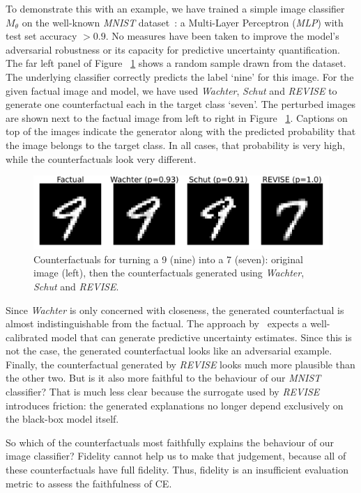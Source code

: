 To demonstrate this with an example, we have trained a simple image classifier $M_{\theta}$ on the well-known \textit{MNIST} dataset~\citep{lecun1998mnist}: a Multi-Layer Perceptron (\textit{MLP}) with test set accuracy $> 0.9$. No measures have been taken to improve the model's adversarial robustness or its capacity for predictive uncertainty quantification. The far left panel of Figure ~\ref{fig:motiv} shows a random sample drawn from the dataset. The underlying classifier correctly predicts the label `nine' for this image. For the given factual image and model, we have used \textit{Wachter}, \textit{Schut} and \textit{REVISE} to generate one counterfactual each in the target class `seven'. The perturbed images are shown next to the factual image from left to right in Figure ~\ref{fig:motiv}. Captions on top of the images indicate the generator along with the predicted probability that the image belongs to the target class. In all cases, that probability is very high, while the counterfactuals look very different.

\begin{figure}
  \centering
  \includegraphics[width=0.8\linewidth]{../artifacts/results/images/mnist_motivation.png}
  \caption{Counterfactuals for turning a 9 (nine) into a 7 (seven): original image (left), then the counterfactuals generated using \textit{Wachter}, \textit{Schut} and \textit{REVISE}.}\label{fig:motiv}
\end{figure}

Since \textit{Wachter} is only concerned with closeness, the generated counterfactual is almost indistinguishable from the factual. The approach by~\citet{schut2021generating} expects a well-calibrated model that can generate predictive uncertainty estimates. Since this is not the case, the generated counterfactual looks like an adversarial example. Finally, the counterfactual generated by \textit{REVISE} looks much more plausible than the other two. But is it also more faithful to the behaviour of our \textit{MNIST} classifier? That is much less clear because the surrogate used by \textit{REVISE} introduces friction: the generated explanations no longer depend exclusively on the black-box model itself. 

So which of the counterfactuals most faithfully explains the behaviour of our image classifier? Fidelity cannot help us to make that judgement, because all of these counterfactuals have full fidelity. Thus, fidelity is an insufficient evaluation metric to assess the faithfulness of CE. 

